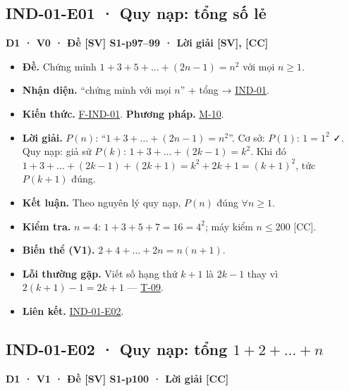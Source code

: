 \documentclass[
  10pt,
  twoside,openany]{book}
\providecommand{\tightlist}{%
  \setlength{\itemsep}{0pt}\setlength{\parskip}{0pt}}
\begin{document}
\hypertarget{IND-01-E01}{%
\subsection{IND-01-E01 · Quy nạp: tổng số lẻ}\label{IND-01-E01}}

\textbf{D1 · V0 · Đề {[}SV{]} S1-p97--99 · Lời giải {[}SV{]}, {[}CC{]}}

\begin{itemize}
\tightlist
\item
  \textbf{Đề.} Chứng minh \(1+3+5+\dots+(2n-1)=n^2\) với mọi \(n\ge1\).
\item
  \textbf{Nhận diện.} ``chứng minh với mọi \(n\)'' + tổng →
  \protect\hyperlink{IND-01}{IND-01}.
\item
  \textbf{Kiến thức.} \protect\hyperlink{F-IND-01}{F-IND-01}.
  \textbf{Phương pháp.} \protect\hyperlink{M-10}{M-10}.
\item
  \textbf{Lời giải.} \(P(n)\): ``\(1+3+\dots+(2n-1)=n^2\)''. Cơ sở:
  \(P(1)\): \(1=1^2\) ✓. Quy nạp: giả sử \(P(k)\):
  \(1+3+\dots+(2k-1)=k^2\). Khi đó
  \(1+3+\dots+(2k-1)+(2k+1)=k^2+2k+1=(k+1)^2\), tức \(P(k+1)\) đúng.
\item
  \textbf{Kết luận.} Theo nguyên lý quy nạp, \(P(n)\) đúng
  \(\forall n\ge1\).
\item
  \textbf{Kiểm tra.} \(n=4\): \(1+3+5+7=16=4^2\); máy kiểm \(n\le200\)
  {[}CC{]}.
\item
  \textbf{Biến thể (V1).} \(2+4+\dots+2n=n(n+1)\).
\item
  \textbf{Lỗi thường gặp.} Viết số hạng thứ \(k+1\) là \(2k-1\) thay vì
  \(2(k+1)-1=2k+1\) --- \protect\hyperlink{T-09}{T-09}.
\item
  \textbf{Liên kết.} \protect\hyperlink{IND-01-E02}{IND-01-E02}.
\end{itemize}

\hypertarget{IND-01-E02}{%
\subsection{\texorpdfstring{IND-01-E02 · Quy nạp: tổng
\(1+2+\dots+n\)}{IND-01-E02 · Quy nạp: tổng 1+2+\textbackslash dots+n}}\label{IND-01-E02}}

\textbf{D1 · V1 · Đề {[}SV{]} S1-p100 · Lời giải {[}CC{]}}
\end{document}
